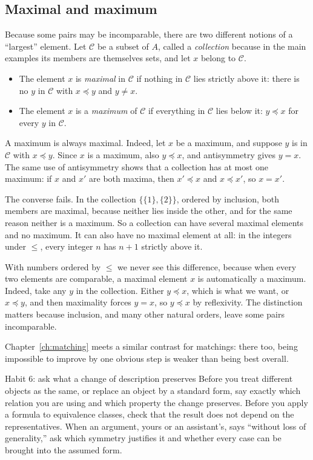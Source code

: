 \subsection*{Maximal and maximum}
Because some pairs may be incomparable, there are two different notions of a ``largest'' element. Let $\mathcal C$ be a subset of $A$, called a \emph{collection} because in the main examples its members are themselves sets, and let $x$ belong to $\mathcal C$.
\begin{itemize}
\item The element $x$ is \emph{maximal} in $\mathcal C$ if nothing in $\mathcal C$ lies strictly above it: there is no $y$ in $\mathcal C$ with $x\preceq y$ and $y\ne x$.
\item The element $x$ is a \emph{maximum} of $\mathcal C$ if everything in $\mathcal C$ lies below it: $y\preceq x$ for every $y$ in $\mathcal C$.
\end{itemize}
A maximum is always maximal. Indeed, let $x$ be a maximum, and suppose $y$ is in $\mathcal C$ with $x\preceq y$. Since $x$ is a maximum, also $y\preceq x$, and antisymmetry gives $y=x$. The same use of antisymmetry shows that a collection has at most one maximum: if $x$ and $x'$ are both maxima, then $x'\preceq x$ and $x\preceq x'$, so $x=x'$.

The converse fails. In the collection $\{\{1\},\{2\}\}$, ordered by inclusion, both members are maximal, because neither lies inside the other, and for the same reason neither is a maximum. So a collection can have several maximal elements and no maximum. It can also have no maximal element at all: in the integers under $\le$, every integer $n$ has $n+1$ strictly above it.

With numbers ordered by $\le$ we never see this difference, because when every two elements are comparable, a maximal element $x$ is automatically a maximum. Indeed, take any $y$ in the collection. Either $y\preceq x$, which is what we want, or $x\preceq y$, and then maximality forces $y=x$, so $y\preceq x$ by reflexivity. The distinction matters because inclusion, and many other natural orders, leave some pairs incomparable.

Chapter~\ref{ch:matching} meets a similar contrast for matchings: there too, being impossible to improve by one obvious step is weaker than being best overall.

\begin{principle}{Habit 6: ask what a change of description preserves}
Before you treat different objects as the same, or replace an object by a standard form, say exactly which relation you are using and which property the change preserves. Before you apply a formula to equivalence classes, check that the result does not depend on the representatives. When an argument, yours or an assistant's, says ``without loss of generality,'' ask which symmetry justifies it and whether every case can be brought into the assumed form.
\end{principle}
